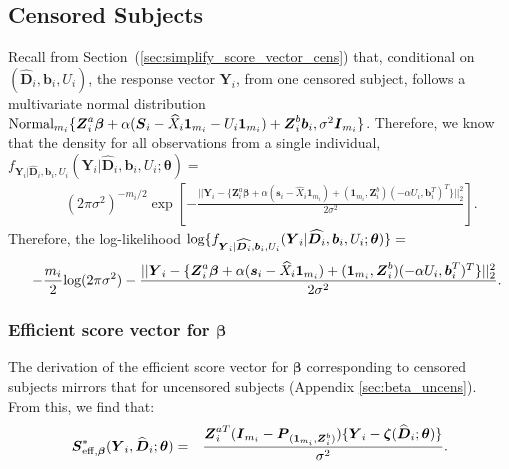 \documentclass[12pt]{article}
\def\log{\hbox{log}}
\def\Normal{\hbox{Normal}}
\def\bse{\begin{eqnarray*}}
\def\ese{\end{eqnarray*}}
\def\be{\begin{eqnarray}}
\def\ee{\end{eqnarray}}
\def\bse{\begin{eqnarray*}}
\def\ese{\end{eqnarray*}}
\def\bS{{\mathbf S}}
\newcommand{\bzeta}{\mbox{\boldmath $\zeta$}}
\def\bbeta{{\boldsymbol{\beta}}}
\def\btheta{{\boldsymbol{\theta}}}
\def\bone{{\boldsymbol{1}}}
\def\bb{{\boldsymbol b}}
\def\bs{{\boldsymbol s}}
\def\bD{{\boldsymbol D}}
\def\bI{{\boldsymbol I}}
\def\bP{{\boldsymbol P}}
\def\bS{{\boldsymbol S}}
\def\bY{{\boldsymbol Y}}
\def\bZ{{\boldsymbol Z}}
\def\tilD{\bD}
\begin{document}
\subsection{Censored Subjects}
\label{sec:calcs_cens}
Recall from Section~(\ref{sec:simplify_score_vector_cens}) that, conditional on $(\widehat{\tilD}_i, \bb_i,U_i)$, the response vector $\bY_i$, from one censored subject, follows a multivariate normal distribution $\Normal_{m_i}\{\bZ^a_i\bbeta  + \alpha(\bS_i - \widehat{X}_i\bone_{m_i} - U_i\bone_{m_i}) + \bZ^b_i\bb_i, \sigma^2\bI_{m_i}\}$. Therefore, we know that the density for all observations from a single individual, $f_{\bY_i|\widehat{\tilD}_i,\bb_i,U_i}(\bY_i|\widehat{\tilD}_i,\bb_i,U_i;\btheta)=$
\bse
&&(2\pi\sigma^2)^{-m_i/2}\exp\left[-\frac{||\bY_i-\{\bZ_i^a\bbeta  + \alpha(\bs_i - \widehat{X}_i\bone_{m_i}) + (\bone_{m_i},\bZ_i^b)(-\alpha U_i, \bb_i^T)^T\}||^2_2}{2\sigma^2}\right].
\ese
Therefore, the log-likelihood $\log\{f_{\bY_i|\widehat{\tilD_i},\bb_i,U_i}(\bY_i|\widehat{\tilD_i},\bb_i,U_i;\btheta)\}=$
\be
\label{eqn:log_lik_cens}
&&-\frac{m_i}{2}\log(2\pi\sigma^2)-\frac{||\bY_i-\{\bZ_i^a\bbeta  + \alpha(\bs_i - \widehat{X}_i\bone_{m_i}) + (\bone_{m_i},\bZ_i^b)(-\alpha U_i, \bb_i^T)^T\}||^2_2}{2\sigma^2}.
\ee
\subsubsection{Efficient score vector for $\bbeta$}
The derivation of the efficient score vector for $\bbeta$ corresponding to censored subjects mirrors that for uncensored subjects (Appendix \ref{sec:beta_uncens}). From this, we find that:
\bse
\bS_{\rm{eff},\bbeta}^*(\bY_i,\widehat{\tilD}_i;\btheta)
&=&\frac{\bZ_i^{aT}(\bI_{m_i} - \bP_{(\bone_{m_i},\bZ^b_i)})\{\bY_i-\bzeta(\widehat{\tilD}_i;\btheta)\}}{\sigma^2}.
\ese
\end{document}
